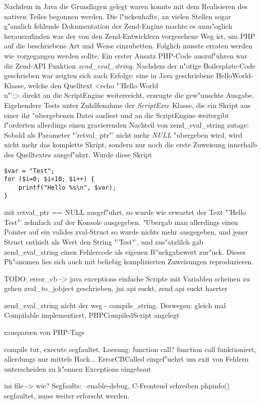 Nachdem in Java die Grundlagen gelegt waren konnte mit dem Realisieren des nativen Teiles begonnen werden.
Die l"uckenhafte, an vielen Stellen sogar g"anzlich fehlende Dokumentation der Zend-Engine machte es unm"oglich
herauszufinden was der von den Zend-Entwicklern vorgesehene Weg ist, um PHP auf die beschriebene Art und Weise
einzubetten. Folglich musste erraten werden wie vorgegangen werden sollte.
Ein erster Ansatz PHP-Code auszuf"uhren war die Zend-API Funktion \emph{zend\_eval\_string}. Nachdem der n"otige
Boilerplate-Code geschrieben war zeigten sich auch Erfolge: eine in Java geschriebene HelloWorld-Klasse, welche
den Quelltext <echo "'Hello World\\n"';> direkt an die ScriptEngine weiterreicht, erzeugte die gew"unschte Ausgabe.
Eigehendere Tests unter Zuhilfenahme der \emph{ScriptExec} Klasse, die ein Skript aus einer ihr "ubergebenen Datei
ausliest und an die ScriptEngine weitergibt f"orderten allerdings einen gravierenden Nachteil von zend\_eval\_string
zutage: Sobald als Parameter "'retval\_ptr"' nicht mehr \emph{NULL} "ubergeben wird, wird nicht mehr das komplette
Skript, sondern nur noch die erste Zuweisung innerhalb des Quelltextes ausgef"uhrt. Wurde diese Skript
\begin{lstlisting}[caption=Testscript f"ur zend\_eval\_string()]
$var = "Test";
for ($i=0; $i<10; $i++) {
    printf("Hello %s\n", $var);
}
\end{lstlisting}
mit retval\_ptr == NULL ausgef"uhrt, so wurde wie erwartet der Text "'Hello Test"' zehnfach auf der Konsole
ausgegeben. "Ubergab man allerdings einen Pointer auf ein valides zval-Struct so wurde nichts mehr ausgegeben,
und jener Struct enthielt als Wert den String "'Test"', und zus"atzlilch gab zend\_eval\_string einen Fehlercode
als eigenen R"uckgabewert zur"uck. Dieses Ph"anomen lies sich auch mit beliebig komplizierten Zuweisungen reproduzieren.

TODO:
error\_cb  -> java exceptions
einfache Scripte mit Variablen scheinen zu gehen
zval\_to\_jobject geschrieben, jni api suckt, zend api suckt haerter

zend\_eval\_string nicht der weg - compile\_string. Deswegen: gleich mal Compilable implementiert, PHPCompiledScript
angelegt

rausparsen von PHP-Tags

compile tut, execute segfaultet. Loesung: function call?
function call funktioniert, allerdungs nur mittels Hack...
ErrorCBCalled eingef"uehrt um exit von Fehlern unterscheiden zu k"onnen
Exceptions eingebaut

ini file -> wie?
Segfaults: --enable-debug, C-Frontend schreiben
phpinfo() segfaultet, muss weiter erforscht werden.






